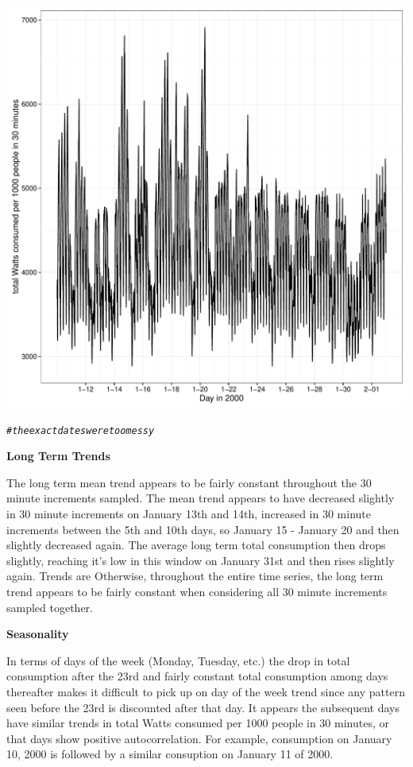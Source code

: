 \documentclass[11pt]{article}\usepackage[]{graphicx}\usepackage[]{color}
\makeatletter
\def\maxwidth{ %
  \ifdim\Gin@nat@width>\linewidth
    \linewidth
  \else
    \Gin@nat@width
  \fi
}
\newcommand{\hlcom}[1]{\textcolor[rgb]{0.4,0.4,0.4}{\textit{#1}}}%
\newenvironment{kframe}{%
 \def\at@end@of@kframe{}%
 \ifinner\ifhmode%
  \def\at@end@of@kframe{\end{minipage}}%
  \begin{minipage}{\columnwidth}%
 \fi\fi%
 \def\FrameCommand##1{\hskip\@totalleftmargin \hskip-\fboxsep
 \colorbox{shadecolor}{##1}\hskip-\fboxsep
     \hskip-\linewidth \hskip-\@totalleftmargin \hskip\columnwidth}%
 \MakeFramed {\advance\hsize-\width
   \@totalleftmargin\z@ \linewidth\hsize
   \@setminipage}}%
 {\par\unskip\endMakeFramed%
 \at@end@of@kframe}
\newenvironment{knitrout}{}{} %
\makeatother
\begin{document}
\begin{enumerate}
\begin{enumerate}
\begin{knitrout}
{\centering \includegraphics[width=\maxwidth]{figure/prob5a-1} 

}


\begin{kframe}\begin{alltt}
\hlcom{#the exact dates were too messy}
\end{alltt}
\end{kframe}
\end{knitrout}

{\bf Long Term Trends}

The long term mean trend appears to be fairly constant throughout the 30 minute increments sampled. The mean trend appears to have decreased slightly in 30 minute increments on January 13th and 14th, increased in 30 minute increments between the 5th and 10th days, so January 15 - January 20 and then slightly decreased again. The average long term total consumption then drops slightly, reaching it's low in this window on January 31st and then rises slightly again. Trends are Otherwise, throughout the entire time series, the long term trend appears to be fairly constant when considering all 30 minute increments sampled together.

\newpage

{\bf Seasonality}

In terms of days of the week (Monday, Tuesday, etc.) the drop in total consumption after the 23rd and fairly constant total consumption among days thereafter makes it difficult to pick up on day of the week trend since any pattern seen before the 23rd is discounted after that day. It appears the subsequent days have similar trends in total Watts consumed per 1000 people in 30 minutes, or that days show positive autocorrelation.  For example, consumption on January 10, 2000 is followed by a similar consuption on January 11 of 2000.


\end{enumerate}
\end{enumerate}
\end{document}
